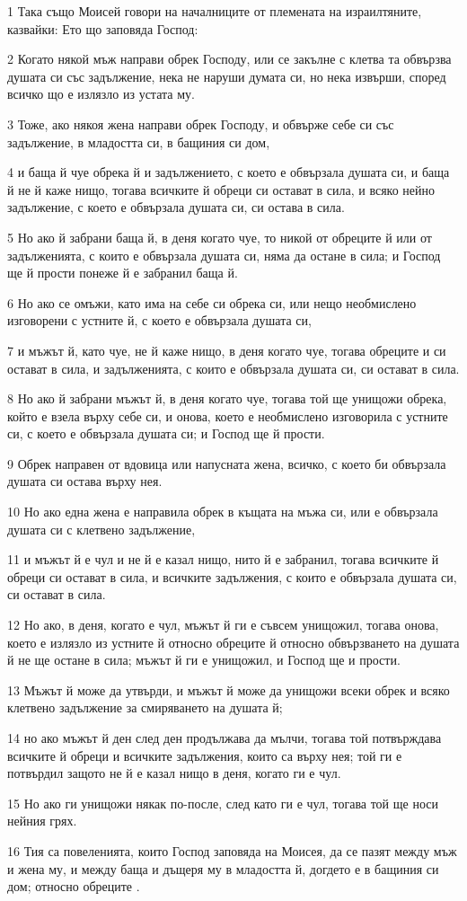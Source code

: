 \par 1 Така също Моисей говори на началниците от племената на израилтяните, казвайки: Ето що заповяда Господ:
\par 2 Когато някой мъж направи обрек Господу, или се закълне с клетва та обвързва душата си със задължение, нека не наруши думата си, но нека извърши, според всичко що е излязло из устата му.
\par 3 Тоже, ако някоя жена направи обрек Господу, и обвърже себе си със задължение, в младостта си, в бащиния си дом,
\par 4 и баща й чуе обрека й и задължението, с което е обвързала душата си, и баща й не й каже нищо, тогава всичките й обреци си остават в сила, и всяко нейно задължение, с което е обвързала душата си, си остава в сила.
\par 5 Но ако й забрани баща й, в деня когато чуе, то никой от обреците й или от задълженията, с които е обвързала душата си, няма да остане в сила; и Господ ще й прости понеже й е забранил баща й.
\par 6 Но ако се омъжи, като има на себе си обрека си, или нещо необмислено изговорени с устните й, с което е обвързала душата си,
\par 7 и мъжът й, като чуе, не й каже нищо, в деня когато чуе, тогава обреците и си остават в сила, и задълженията, с които е обвързала душата си, си остават в сила.
\par 8 Но ако й забрани мъжът й, в деня когато чуе, тогава той ще унищожи обрека, който е взела върху себе си, и онова, което е необмислено изговорила с устните си, с което е обвързала душата си; и Господ ще й прости.
\par 9 Обрек направен от вдовица или напусната жена, всичко, с което би обвързала душата си остава върху нея.
\par 10 Но ако една жена е направила обрек в къщата на мъжа си, или е обвързала душата си с клетвено задължение,
\par 11 и мъжът й е чул и не й е казал нищо, нито й е забранил, тогава всичките й обреци си остават в сила, и всичките задължения, с които е обвързала душата си, си остават в сила.
\par 12 Но ако, в деня, когато е чул, мъжът й ги е съвсем унищожил, тогава онова, което е излязло из устните й относно обреците й относно обвързването на душата й не ще остане в сила; мъжът й ги е унищожил, и Господ ще и прости.
\par 13 Мъжът й може да утвърди, и мъжът й може да унищожи всеки обрек и всяко клетвено задължение за смиряването на душата й;
\par 14 но ако мъжът й ден след ден продължава да мълчи, тогава той потвърждава всичките й обреци и всичките задължения, които са върху нея; той ги е потвърдил защото не й е казал нищо в деня, когато ги е чул.
\par 15 Но ако ги унищожи някак по-после, след като ги е чул, тогава той ще носи нейния грях.
\par 16 Тия са повеленията, които Господ заповяда на Моисея, да се пазят между мъж и жена му, и между баща и дъщеря му в младостта й, догдето е в бащиния си дом; относно обреците .

